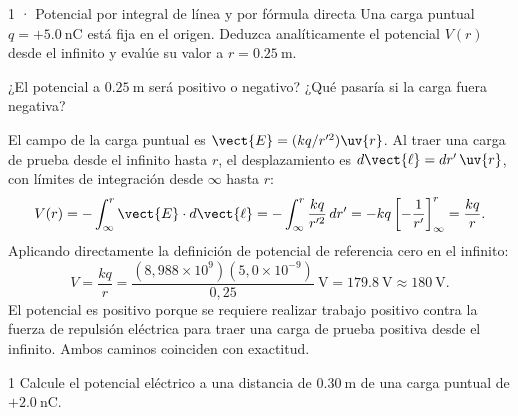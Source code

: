 \documentclass[11pt]{article}
\begin{document}
\begin{eResuelto}{1 · Potencial por integral de línea y por fórmula directa}
Una carga puntual $q=+\SI{5,0}{\nano\coulomb}$ está fija en el origen. Deduzca analíticamente el potencial $V(r)$ desde el infinito y evalúe su valor a $r=\SI{0,25}{\metre}$.
\begin{center}
\end{center}
\begin{ePredice}¿El potencial a $\SI{0,25}{\metre}$ será positivo o negativo? ¿Qué pasaría si la carga fuera negativa?\end{ePredice}
El campo de la carga puntual es $\vect{E}=(kq/r'^2)\uv{r}$. Al traer una carga de prueba desde el infinito hasta $r$, el desplazamiento es $d\vect{\ell}=dr'\,\uv{r}$, con límites de integración desde $\infty$ hasta $r$:
\[ V(r)=-\int_{\infty}^{r}\vect{E}\cdot d\vect{\ell}=-\int_{\infty}^{r}\frac{kq}{r'^2}\,dr'=-kq\left[-\frac{1}{r'}\right]_{\infty}^{r}=\frac{kq}{r}. \]
Aplicando directamente la definición de potencial de referencia cero en el infinito:
\[ V=\frac{kq}{r}=\frac{(8{,}988\times10^9)(5{,}0\times10^{-9})}{0{,}25}\ \si{\volt}=\SI{179,8}{\volt}\approx\SI{180}{\volt}. \]
El potencial es positivo porque se requiere realizar trabajo positivo contra la fuerza de repulsión eléctrica para traer una carga de prueba positiva desde el infinito. Ambos caminos coinciden con exactitud.
\end{eResuelto}

\begin{eReto}{1 }
Calcule el potencial eléctrico a una distancia de $\SI{0,30}{\metre}$ de una carga puntual de $+\SI{2,0}{\nano\coulomb}$.
\end{eReto}
\end{document}
